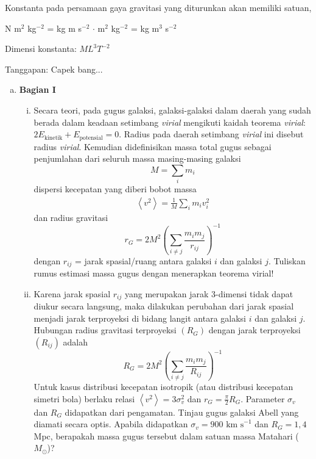 \documentclass[11pt,fleqn]{exam}
\begin{document}
\begin{questions}
\begin{enumerate}[a.]
    Konstanta pada persamaan gaya gravitasi yang diturunkan akan memiliki satuan,
    
    N m$^2$ kg$^{-2}$ = kg m s$^{-2}$ $\cdot$ m$^2$ kg$^{-2}$ = kg m$^{3}$ s$^{-2}$ 
    
    Dimensi konstanta: $ML^{3}T^{-2}$

    Tanggapan: Capek bang... 
\end{enumerate}




\newpage
\question \begin{enumerate}[a.]
    \item \textbf{Bagian I}
    \begin{enumerate}[i.]
        \item Secara teori, pada gugus galaksi, galaksi-galaksi dalam daerah yang sudah berada dalam keadaan setimbang \textit{virial} mengikuti kaidah teorema \textit{virial}: $2 E_\text{kinetik} + E_\text{potensial} = 0$. Radius pada daerah setimbang \textit{virial} ini disebut radius \textit{virial}. Kemudian didefinisikan massa total gugus sebagai penjumlahan dari seluruh massa masing-masing galaksi
        \begin{equation*}
            M = \sum_i m_i
        \end{equation*}
        dispersi kecepatan yang diberi bobot massa
        \begin{eqnarray*}
            \left< v^2 \right> = \frac{1}{M} \sum_i m_i v_i^2
        \end{eqnarray*}
        dan radius gravitasi
        \begin{equation*}
            r_G = 2M^2 \left( \sum_{i \neq j} \frac{m_i m_j}{r_{ij}} \right)^{-1}
        \end{equation*}
        dengan $r_{ij}$ = jarak spasial/ruang antara galaksi $i$ dan galaksi $j$. Tuliskan rumus estimasi massa gugus dengan menerapkan teorema virial! 

        \item Karena jarak spasial $r_{ij}$ yang merupakan jarak 3-dimensi tidak dapat diukur secara langsung, maka dilakukan perubahan dari jarak spasial menjadi jarak terproyeksi di bidang langit antara galaksi $i$ dan galaksi $j$. Hubungan radius gravitasi terproyeksi $(R_G)$ dengan jarak terproyeksi $(R_{ij})$ adalah
        \begin{equation*}
            R_G = 2M^2 \left( \sum_{i \neq j} \frac{m_i m_j}{R_{ij}} \right)^{-1}
        \end{equation*}
        Untuk kasus distribusi kecepatan isotropik (atau distribusi kecepatan simetri bola) berlaku relasi $\left< v^2 \right> = 3 \sigma_v^2$ dan $r_G = \frac{\pi}{2} R_G$. Parameter $\sigma_v$ dan $R_G$ didapatkan dari pengamatan. Tinjau gugus galaksi Abell yang diamati secara optis. Apabila didapatkan $\sigma_v = 900 \text{ km s}^{-1}$ dan $R_G = 1,4$ Mpc, berapakah massa gugus tersebut dalam satuan massa Matahari ($M_\odot$)?
    \end{enumerate}
    

\end{enumerate}
\end{questions}
\end{document}
